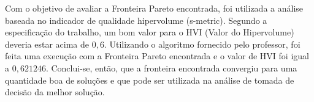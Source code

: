 Com o objetivo de avaliar a Fronteira Pareto encontrada, foi utilizada a análise baseada no indicador de qualidade hipervolume (s-metric). Segundo a especificação do trabalho, um bom valor para o HVI (Valor do Hipervolume) deveria estar acima de $0,6$. Utilizando o algoritmo fornecido pelo professor, foi feita uma execução com a Fronteira Pareto encontrada e o valor de HVI foi igual a $0,621246$. Conclui-se, então, que a fronteira encontrada convergiu para uma quantidade boa de soluções e que pode ser utilizada na análise de tomada de decisão da melhor solução.